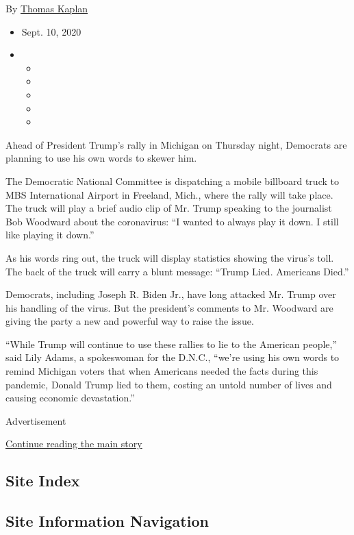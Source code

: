 By \href{https://www.nytimes3xbfgragh.onion/by/thomas-kaplan}{Thomas
Kaplan}

\begin{itemize}
\item
  Sept. 10, 2020
\item
  \begin{itemize}
  \item
  \item
  \item
  \item
  \item
  \end{itemize}
\end{itemize}

Ahead of President Trump's rally in Michigan on Thursday night,
Democrats are planning to use his own words to skewer him.

The Democratic National Committee is dispatching a mobile billboard
truck to MBS International Airport in Freeland, Mich., where the rally
will take place. The truck will play a brief audio clip of Mr. Trump
speaking to the journalist Bob Woodward about the coronavirus: ``I
wanted to always play it down. I still like playing it down.''

As his words ring out, the truck will display statistics showing the
virus's toll. The back of the truck will carry a blunt message: ``Trump
Lied. Americans Died.''

Democrats, including Joseph R. Biden Jr., have long attacked Mr. Trump
over his handling of the virus. But the president's comments to Mr.
Woodward are giving the party a new and powerful way to raise the issue.

``While Trump will continue to use these rallies to lie to the American
people,'' said Lily Adams, a spokeswoman for the D.N.C., ``we're using
his own words to remind Michigan voters that when Americans needed the
facts during this pandemic, Donald Trump lied to them, costing an untold
number of lives and causing economic devastation.''

Advertisement

\protect\hyperlink{after-bottom}{Continue reading the main story}

\hypertarget{site-index}{%
\subsection{Site Index}\label{site-index}}

\hypertarget{site-information-navigation}{%
\subsection{Site Information
Navigation}\label{site-information-navigation}}

